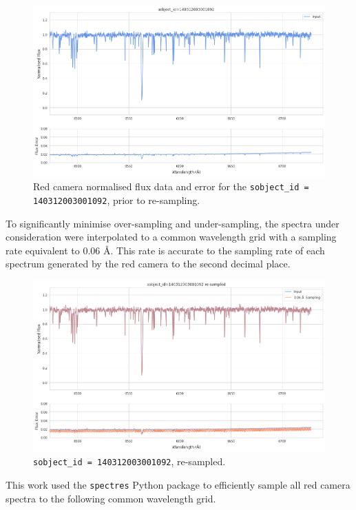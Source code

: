 \begin{figure}[!htb]
\centering
\includegraphics[scale=.40]{figures/input spectrum.png}
\caption{Red camera normalised flux data and error for the \texttt{sobject\_id = 140312003001092}, prior to re-sampling.}
\end{figure}

To significantly minimise over-sampling and under-sampling, the spectra under consideration were interpolated to a common wavelength grid with a sampling rate equivalent to 0.06 \r{A}. This rate is accurate to the sampling rate of each spectrum generated by the red camera to the second decimal place.

\begin{figure}[!htb]
\centering
\includegraphics[scale=.40]{figures/resampling example.png}
\caption{\texttt{sobject\_id = 140312003001092}, re-sampled.}
\end{figure}

This work used the \texttt{spectres} Python package\cite{carnall2017spectres} to efficiently sample all red camera spectra to the following common wavelength grid.

